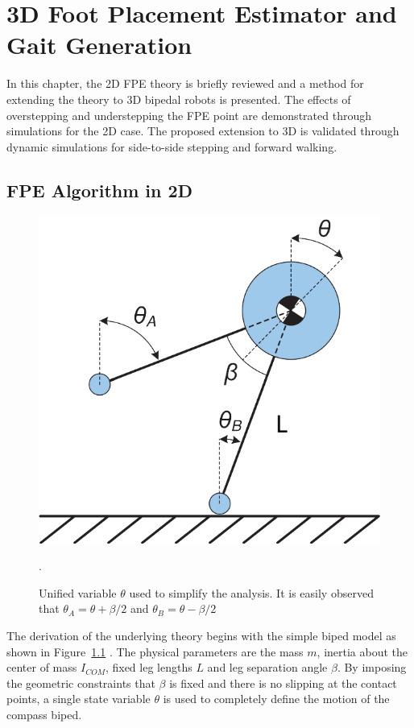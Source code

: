 \chapter{3D Foot Placement Estimator and Gait Generation} %
\label{cha:simulations}

In this chapter, the 2D FPE theory is briefly reviewed and a method for extending the theory to 3D bipedal robots is presented. The effects of overstepping and understepping the FPE point are demonstrated through simulations for the 2D case. The proposed extension to 3D is validated through dynamic simulations for side-to-side stepping and forward walking. 

\section{FPE Algorithm in 2D} %
\label{sec:foot_placement_estimator_in_2d}

\begin{figure}[!h]
	\centering
    \includegraphics[scale=0.7]{fig/simulations/compass.pdf}
  	\caption{Unified variable $\theta$ used to simplify the analysis. It is easily observed that $\theta_A = \theta  + \beta /2$ and $\theta_B = \theta  - \beta /2$}.
	\label{fig:unified}
\end{figure}

The derivation of the underlying theory begins with the simple biped model as shown in Figure~\ref{fig:unified} \cite{Wight:2008ii}. The physical parameters are the mass $m$, inertia about the center of mass $I_{COM}$, fixed leg lengths $L$ and leg separation angle $\beta$. By imposing the geometric constraints that $\beta$ is fixed and there is no slipping at the contact points, a single state variable $\theta$ is used to completely define the motion of the compass biped.

